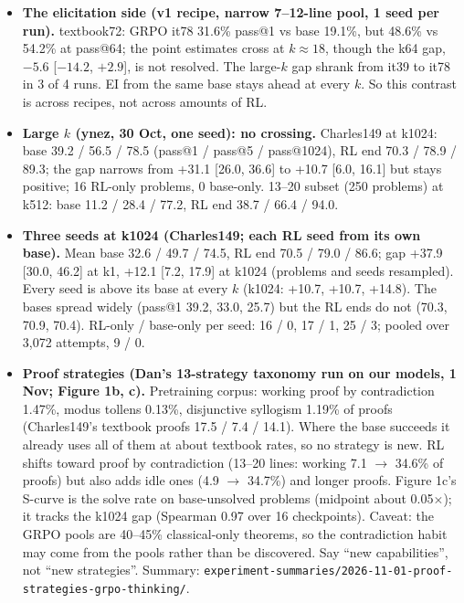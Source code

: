 {\begin{itemize}[nosep,leftmargin=1.2em]
    RL, against 5.7--21.7 $\to$ 21.7--72.6\% with full exposure. RL builds a lot, but not a skill with no support.
  \item \textbf{The elicitation side (v1 recipe, narrow 7--12-line pool, 1 seed per run).} textbook72: GRPO it78
    31.6\% pass@1 vs base 19.1\%, but 48.6\% vs 54.2\% at pass@64; the point estimates cross at $k\approx18$, though the
    k64 gap, $-5.6$ [$-14.2$, $+2.9$], is not resolved. The large-$k$ gap shrank from it39 to it78 in 3 of 4 runs. EI from the same base stays ahead at every $k$. So this
    contrast is across recipes, not across amounts of RL.
  \item \textbf{Large $k$ (ynez, 30 Oct, one seed): no crossing.} Charles149 at k1024: base 39.2 / 56.5 / 78.5
    (pass@1 / pass@5 / pass@1024), RL end 70.3 / 78.9 / 89.3; the gap narrows from +31.1 [26.0, 36.6] to +10.7 [6.0,
    16.1] but stays positive; 16 RL-only problems, 0 base-only. 13--20 subset (250 problems) at k512: base 11.2 / 28.4
    / 77.2, RL end 38.7 / 66.4 / 94.0.
  \item \textbf{Three seeds at k1024 (Charles149; each RL seed from its own base).} Mean base 32.6 / 49.7 / 74.5, RL
    end 70.5 / 79.0 / 86.6; gap +37.9 [30.0, 46.2] at k1, +12.1 [7.2, 17.9] at k1024 (problems and seeds resampled).
    Every seed is above its base at every $k$ (k1024: +10.7, +10.7, +14.8). The bases spread widely (pass@1 39.2, 33.0,
    25.7) but the RL ends do not (70.3, 70.9, 70.4). RL-only / base-only per seed: 16 / 0, 17 / 1, 25 / 3; pooled over
    3,072 attempts, 9 / 0.
  \item \textbf{Proof strategies (Dan's 13-strategy taxonomy run on our models, 1 Nov; Figure 1b, c).} Pretraining
    corpus: working proof by contradiction 1.47\%, modus tollens 0.13\%, disjunctive syllogism 1.19\% of proofs
    (Charles149's textbook proofs 17.5 / 7.4 / 14.1). Where the base succeeds it already uses all of them at about
    textbook rates, so no strategy is new. RL shifts toward proof by contradiction (13--20 lines: working 7.1 $\to$
    34.6\% of proofs) but also adds idle ones (4.9 $\to$ 34.7\%) and longer proofs. Figure 1c's S-curve is the solve
    rate on base-unsolved problems (midpoint about 0.05$\times$); it tracks the k1024 gap (Spearman 0.97 over 16
    checkpoints). Caveat: the GRPO pools are 40--45\% classical-only theorems, so the contradiction habit may come from
    the pools rather than be discovered. Say ``new capabilities'', not ``new strategies''. Summary:
    \nolinkurl{experiment-summaries/2026-11-01-proof-strategies-grpo-thinking/}.

\end{itemize}}
